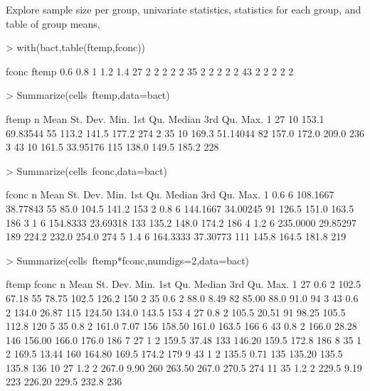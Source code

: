 \documentclass{article}
\begin{document}
Explore sample size per group, univariate statistics, statistics for each group, and table of group means,
\begin{Schunk}
\begin{Sinput}
> with(bact,table(ftemp,fconc))
\end{Sinput}
\begin{Soutput}
     fconc
ftemp 0.6 0.8 1 1.2 1.4
   27   2   2 2   2   2
   35   2   2 2   2   2
   43   2   2 2   2   2
\end{Soutput}
\begin{Sinput}
> Summarize(cells~ftemp,data=bact)
\end{Sinput}
\begin{Soutput}
  ftemp  n  Mean St. Dev. Min. 1st Qu. Median 3rd Qu. Max.
1    27 10 153.1 69.83544   55   113.2  141.5   177.2  274
2    35 10 169.3 51.14044   82   157.0  172.0   209.0  236
3    43 10 161.5 33.95176  115   138.0  149.5   185.2  228
\end{Soutput}
\begin{Sinput}
> Summarize(cells~fconc,data=bact)
\end{Sinput}
\begin{Soutput}
  fconc n     Mean St. Dev. Min. 1st Qu. Median 3rd Qu. Max.
1   0.6 6 108.1667 38.77843   55    85.0  104.5   141.2  153
2   0.8 6 144.1667 34.00245   91   126.5  151.0   163.5  186
3     1 6 154.8333 23.69318  133   135.2  148.0   174.2  186
4   1.2 6 235.0000 29.85297  189   224.2  232.0   254.0  274
5   1.4 6 164.3333 37.30773  111   145.8  164.5   181.8  219
\end{Soutput}
\begin{Sinput}
> Summarize(cells~ftemp*fconc,numdigs=2,data=bact)
\end{Sinput}
\begin{Soutput}
   ftemp fconc n  Mean St. Dev. Min. 1st Qu. Median 3rd Qu. Max.
1     27   0.6 2 102.5    67.18   55   78.75  102.5   126.2  150
2     35   0.6 2  88.0     8.49   82   85.00   88.0    91.0   94
3     43   0.6 2 134.0    26.87  115  124.50  134.0   143.5  153
4     27   0.8 2 105.5    20.51   91   98.25  105.5   112.8  120
5     35   0.8 2 161.0     7.07  156  158.50  161.0   163.5  166
6     43   0.8 2 166.0    28.28  146  156.00  166.0   176.0  186
7     27     1 2 159.5    37.48  133  146.20  159.5   172.8  186
8     35     1 2 169.5    13.44  160  164.80  169.5   174.2  179
9     43     1 2 135.5     0.71  135  135.20  135.5   135.8  136
10    27   1.2 2 267.0     9.90  260  263.50  267.0   270.5  274
11    35   1.2 2 229.5     9.19  223  226.20  229.5   232.8  236

\end{Soutput}
\end{Schunk}
\end{document}

